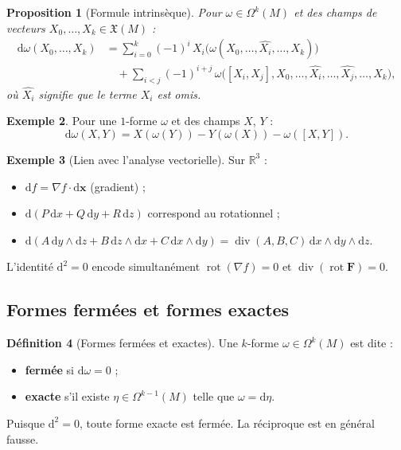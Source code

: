 \documentclass[12pt,a4paper,openany]{book}
\theoremstyle{definition}
\newtheorem{definition}{Définition}[chapter]
\newtheorem{exemple}[definition]{Exemple}
\theoremstyle{plain}
\newtheorem{proposition}[definition]{Proposition}
\theoremstyle{remark}
\newcommand{\R}{\mathbb{R}}
\newcommand{\dd}{\mathrm{d}}
\begin{document}
\begin{proposition}[Formule intrinsèque]\label{prop:formule-intrinseque-d}%
Pour $\omega \in \Omega^k(M)$ et des champs de vecteurs
$X_0, \ldots, X_k \in \mathfrak{X}(M)$ :
\begin{align*}
  \dd\omega(X_0, \ldots, X_k) &= \sum_{i=0}^k (-1)^i\, X_i\bigl(
    \omega(X_0, \ldots, \widehat{X_i}, \ldots, X_k)\bigr) \\
    &\quad + \sum_{i < j} (-1)^{i+j}\, \omega\bigl([X_i, X_j],
    X_0, \ldots, \widehat{X_i}, \ldots, \widehat{X_j}, \ldots, X_k\bigr),
\end{align*}
où $\widehat{X_i}$ signifie que le terme $X_i$ est omis.
\end{proposition}

\begin{exemple}\label{ex:d-1-forme}
Pour une $1$-forme $\omega$ et des champs $X$, $Y$ :
\[
  \dd\omega(X, Y) = X(\omega(Y)) - Y(\omega(X)) - \omega([X, Y]).
\]
\end{exemple}

\begin{exemple}[Lien avec l'analyse vectorielle]\label{ex:analyse-vectorielle}%
Sur $\R^3$ :
\begin{itemize}
  \item $\dd f = \nabla f \cdot \dd\mathbf{x}$ (gradient) ;
  \item $\dd(P\,\dd x + Q\,\dd y + R\,\dd z)$ correspond au rotationnel ;
  \item $\dd(A\,\dd y \wedge \dd z + B\,\dd z \wedge \dd x +
    C\,\dd x \wedge \dd y) = \operatorname{div}(A,B,C)\,
    \dd x \wedge \dd y \wedge \dd z$.
\end{itemize}
L'identité $\dd^2 = 0$ encode simultanément
$\operatorname{rot}(\nabla f) = 0$ et
$\operatorname{div}(\operatorname{rot} \mathbf{F}) = 0$.
\end{exemple}

\subsection{Formes fermées et formes exactes}\label{subsec:fermees-exactes}

\begin{definition}[Formes fermées et exactes]\label{def:fermee-exacte}%
Une $k$-forme $\omega \in \Omega^k(M)$ est dite :
\begin{itemize}
  \item \textbf{fermée} si $\dd\omega = 0$ ;
  \item \textbf{exacte} s'il existe $\eta \in \Omega^{k-1}(M)$ telle que
    $\omega = \dd\eta$.
\end{itemize}
Puisque $\dd^2 = 0$, toute forme exacte est fermée. La réciproque est
en général fausse.
\end{definition}
\end{document}
